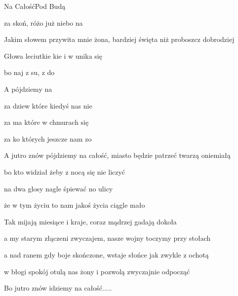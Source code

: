 \begin{song}{Na Całość}{}{}{Pod Budą}{}{}
  \begin{SBVerse}
      za skoń, różo już niebo na  

    Jakim słowem przywita mnie żona, bardziej święta niż proboszcz dobrodziej

    Głowa  leciutkie kie i w  unika się 

    bo naj z  su,  z   do  
  \end{SBVerse}
  \begin{SBChorus}
    A   pójdziemy na  

    za dziew które kiedyś nas nie 

    za ma które w chmurach się 

    za ko których jeszcze  nam zo 
  \end{SBChorus}
  \begin{SBChorus}
    A jutro znów pójdziemy na całość, miasto będzie patrzeć twarzą oniemiałą

    bo kto widział żeby z nocą się nie liczyć

    na dwa glosy nagle śpiewać no ulicy

    że w tym życiu to nam jakoś życia ciągle mało
  \end{SBChorus}
  \begin{SBVerse}
    Tak mijają miesiące i kraje, coraz mądrzej gadają dokoła

    a my starym złączeni zwyczajem, nasze wojny toczymy przy stołach

    a nad ranem gdy boje skończone, wstaje słońce jak zwykle z ochotą

    w błogi spokój otulą nas żony i pozwolą zwyczajnie odpocząć
  \end{SBVerse}
  \begin{SBChorus}
    Bo jutro znów idziemy na całość.....
  \end{SBChorus}
\end{song}
